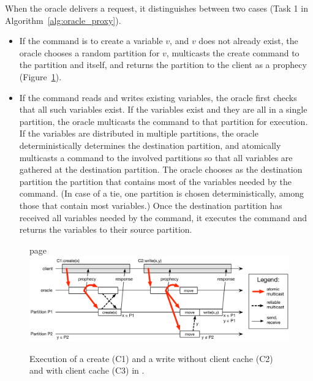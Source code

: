 When the oracle delivers a request, it distinguishes between two cases (Task 1
in Algorithm~\ref{alg:oracle_proxy}).
\begin{itemize}
\item If the command is to create a variable $v$, and $v$ does not already
exist, the oracle chooses a random partition for $v$, multicasts the create
command to the partition and itself, and returns the partition to the client as
a prophecy (Figure~\ref{fig:oracle_repartition}).
\item If the command reads and writes existing variables, the oracle first
checks that all such variables exist. If the variables exist and they are all in
a single partition, the oracle multicasts the command to that partition for
execution. If the variables are distributed in multiple partitions, the oracle
deterministically determines the destination partition, and atomically
multicasts a command to the involved partitions so that all variables are
gathered at the destination partition. The oracle chooses as the destination
partition the partition that contains most of the variables needed by the
command. (In case of a tie, one partition is chosen deterministically, among
those that contain most variables.) Once the destination partition has received
all variables needed by the command, it executes the command and returns the
variables to their source partition.

\end{itemize}







\begin{figure}
\begin{minipage}[b]{1\linewidth} %
page
\centering
      \includegraphics[width=0.9\linewidth]{figures/dynastar}
\end{minipage}
\caption{Execution of a create (C1) and a write without client cache (C2) and with client cache (C3) in \dynastar.}
\label{fig:oracle_repartition}
\end{figure}

